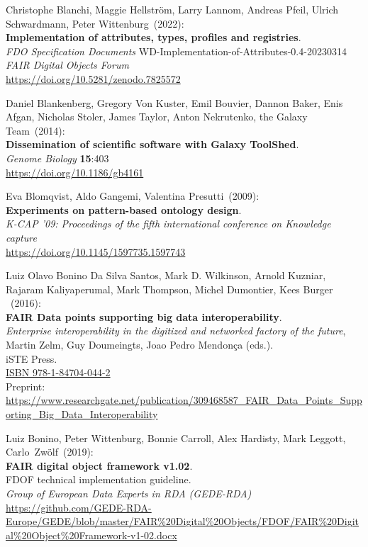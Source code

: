 \begin{thebibliography}{9}
Christophe Blanchi, Maggie Hellström, Larry Lannom, Andreas Pfeil, Ulrich Schwardmann, Peter Wittenburg~(2022): \\
\textbf{Implementation of attributes, types, profiles and registries}. \\
\emph{FDO Specification Documents} WD-Implementation-of-Attributes-0.4-20230314 \\
\emph{FAIR Digital Objects Forum}\\
\url{https://doi.org/10.5281/zenodo.7825572}

Daniel Blankenberg, Gregory Von Kuster, Emil Bouvier, Dannon Baker, Enis Afgan, Nicholas Stoler, James Taylor, Anton Nekrutenko, the Galaxy Team~(2014): \\
\textbf{Dissemination of scientific software with Galaxy ToolShed}.\\
\emph{Genome Biology} \textbf{15}:403\\
\url{https://doi.org/10.1186/gb4161}

Eva Blomqvist, Aldo Gangemi, Valentina Presutti~(2009): \\
\textbf{Experiments on pattern-based ontology design}.\\
\emph{K-CAP '09: Proceedings of the fifth international conference on Knowledge capture}\\
\url{https://doi.org/10.1145/1597735.1597743}

Luiz Olavo Bonino Da Silva Santos, Mark D. Wilkinson, Arnold Kuzniar, Rajaram Kaliyaperumal, Mark Thompson, Michel Dumontier, Kees Burger ~(2016): \\
\textbf{FAIR Data points supporting big data interoperability}. \\
\emph{Enterprise interoperability in the digitized and networked factory of the future}, Martin Zelm, Guy Doumeingts, Joao Pedro Mendonça (eds.).\\
iSTE Press. \\
\href{http://www.iste.co.uk/book.php?id=1073}{ISBN 978-1-84704-044-2} \\
Preprint: \url{https://www.researchgate.net/publication/309468587_FAIR_Data_Points_Supporting_Big_Data_Interoperability}

Luiz Bonino, Peter Wittenburg, Bonnie Carroll, Alex Hardisty, Mark Leggott, Carlo~Zwölf~(2019): \\
\textbf{FAIR digital object framework v1.02}.\\
FDOF technical implementation guideline.\\
\emph{Group of European Data Experts in RDA (GEDE-RDA)}\\
\url{https://github.com/GEDE-RDA-Europe/GEDE/blob/master/FAIR\%20Digital\%20Objects/FDOF/FAIR\%20Digital\%20Object\%20Framework-v1-02.docx}


\end{thebibliography}
